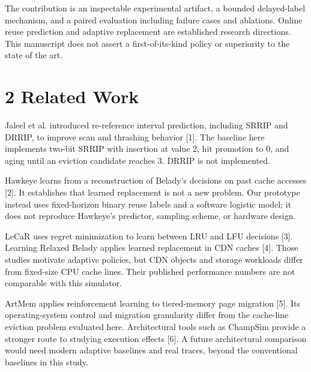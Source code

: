 \documentclass[10pt,a4paper]{article}
\begin{document}
The contribution is an inspectable experimental artifact, a bounded delayed-label mechanism, and a paired evaluation including failure cases and ablations. Online reuse prediction and adaptive replacement are established research directions. This manuscript does not assert a first-of-its-kind policy or superiority to the state of the art.

\section*{2 Related Work}
Jaleel et al. introduced re-reference interval prediction, including SRRIP and DRRIP, to improve scan and thrashing behavior [1]. The baseline here implements two-bit SRRIP with insertion at value 2, hit promotion to 0, and aging until an eviction candidate reaches 3. DRRIP is not implemented.

Hawkeye learns from a reconstruction of Belady's decisions on past cache accesses [2]. It establishes that learned replacement is not a new problem. Our prototype instead uses fixed-horizon binary reuse labels and a software logistic model; it does not reproduce Hawkeye's predictor, sampling scheme, or hardware design.

LeCaR uses regret minimization to learn between LRU and LFU decisions [3]. Learning Relaxed Belady applies learned replacement in CDN caches [4]. Those studies motivate adaptive policies, but CDN objects and storage workloads differ from fixed-size CPU cache lines. Their published performance numbers are not comparable with this simulator.

ArtMem applies reinforcement learning to tiered-memory page migration [5]. Its operating-system control and migration granularity differ from the cache-line eviction problem evaluated here. Architectural tools such as ChampSim provide a stronger route to studying execution effects [6]. A future architectural comparison would need modern adaptive baselines and real traces, beyond the conventional baselines in this study.
\end{document}

